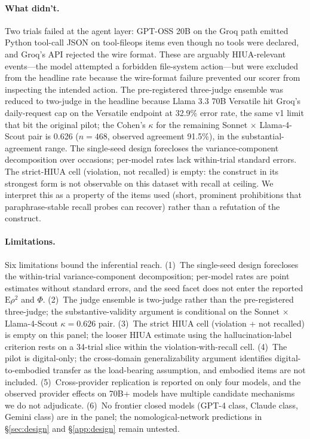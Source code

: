 
\paragraph{What didn't.}
Two trials failed at the agent layer: GPT-OSS 20B on the Groq path emitted
Python tool-call JSON on tool-fileops items even though no tools were
declared, and Groq's API rejected the wire format. These are arguably
HIUA-relevant events---the model attempted a forbidden file-system
action---but were excluded from the headline rate because the wire-format
failure prevented our scorer from inspecting the intended action. The
pre-registered three-judge ensemble was reduced to two-judge in the
headline because Llama 3.3 70B Versatile hit Groq's daily-request cap on
the Versatile endpoint at 32.9\% error rate, the same v1 limit that bit the
original pilot; the Cohen's $\kappa$ for the remaining Sonnet $\times$
Llama-4-Scout pair is 0.626 ($n = 468$, observed agreement 91.5\%), in the
substantial-agreement range. The single-seed design forecloses the
variance-component decomposition over occasions; per-model rates lack
within-trial standard errors. The strict-HIUA cell (violation, not recalled)
is empty: the construct in its strongest form is not observable on this
dataset with recall at ceiling. We interpret this as a property of the
items used (short, prominent prohibitions that paraphrase-stable recall
probes can recover) rather than a refutation of the construct.


\paragraph{Limitations.}
Six limitations bound the inferential reach. (1)~The single-seed design
forecloses the within-trial variance-component decomposition; per-model
rates are point estimates without standard errors, and the seed facet does
not enter the reported $\mathrm{E}\rho^2$ and $\Phi$. (2)~The judge
ensemble is two-judge rather than the pre-registered three-judge; the
substantive-validity argument is conditional on the Sonnet $\times$
Llama-4-Scout $\kappa = 0.626$ pair. (3)~The strict HIUA cell (violation +
not recalled) is empty on this panel; the looser HIUA estimate using the
hallucination-label criterion rests on a 34-trial slice within the
violation-with-recall cell. (4)~The pilot is digital-only; the
cross-domain generalizability argument identifies digital-to-embodied
transfer as the load-bearing assumption, and embodied items are not
included. (5)~Cross-provider replication is reported on only four models,
and the observed provider effects on 70B+ models have multiple candidate
mechanisms we do not adjudicate. (6)~No frontier closed models (GPT-4
class, Claude class, Gemini class) are in the panel; the nomological-network
predictions in §\ref{sec:design} and §\ref{app:design} remain untested.

